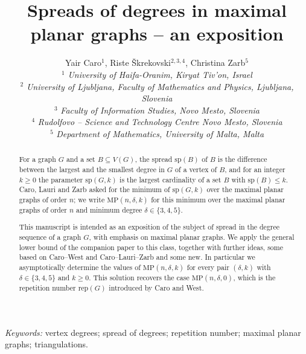 \documentclass[12pt,a4paper]{article}%
\begin{document}

\title{\large Spreads of degrees in maximal planar graphs -- an exposition}
\author{Yair Caro$^{1}$, Riste \v{S}krekovski$^{2,3,4}$, Christina Zarb$^{5}$\\[0.3cm]
{\small $^{1}$ \textit{University of Haifa-Oranim, Kiryat Tiv'on, Israel}}\\[0.1cm]
{\small $^{2}$ \textit{University of Ljubljana, Faculty of Mathematics and Physics,
Ljubljana, Slovenia}}\\[0.1cm]
{\small $^{3}$ \textit{Faculty of Information Studies, Novo Mesto, Slovenia}}\\[0.1cm]
{\small $^{4}$ \textit{Rudolfovo -- Science and Technology Centre Novo Mesto, Slovenia}}\\[0.1cm]
{\small $^{5}$ \textit{Department of Mathematics, University of Malta, Malta}}}
\date{}
\date{}
\maketitle

\begin{abstract}
For a graph $G$ and a set $B\subseteq V(G)$, the spread $\mathrm{sp}(B)$ of $B$ is the difference between the
largest and the smallest degree in $G$ of a vertex of $B$, and for an integer $k\geq 0$ the parameter
$\mathrm{sp}(G,k)$ is the largest cardinality of a set $B$ with $\mathrm{sp}(B)\leq k$. Caro, Lauri and Zarb
asked for the minimum of $\mathrm{sp}(G,k)$ over the maximal planar graphs of order $n$; we write
$\mathrm{MP}(n,\delta ,k)$ for this minimum over the maximal planar graphs of order $n$ and minimum degree
$\delta \in \{3,4,5\}$.

This manuscript is intended as an exposition of the subject of spread in the degree sequence of a graph $G$,
with emphasis on maximal planar graphs. We apply the general lower bound of the companion paper \cite{P1} to
this class, together with further ideas, some based on Caro--West and Caro--Lauri--Zarb and some new. In particular we asymptotically determine the values of $\mathrm{MP}(n,\delta ,k)$ for every pair $(\delta ,k)$ with
$\delta \in \{3,4,5\}$ and $k\geq 0$. This solution recovers the case $\mathrm{MP}(n,\delta ,0)$, which is the
repetition number $\mathrm{rep}(G)$ introduced by Caro and West.
\end{abstract}

\textit{Keywords:} vertex degrees; spread of degrees; repetition number; maximal planar graphs; triangulations.
\end{document}
